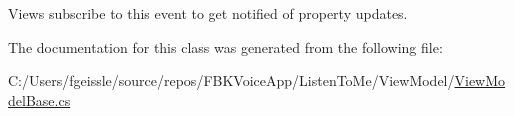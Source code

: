 Views subscribe to this event to get notified of property updates. 



The documentation for this class was generated from the following file\+:\begin{DoxyCompactItemize}
\item 
C\+:/\+Users/fgeissle/source/repos/\+F\+B\+K\+Voice\+App/\+Listen\+To\+Me/\+View\+Model/\mbox{\hyperlink{_view_model_base_8cs}{View\+Model\+Base.\+cs}}\end{DoxyCompactItemize}
